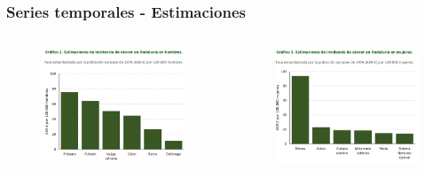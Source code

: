 \documentclass{beamer}
\begin{document}
\begin{frame}\frametitle{Series temporales - Estimaciones}

	\begin{columns}
		\begin{column}{0.5\textwidth}
			\begin{figure}
				\centering
				\includegraphics[width=\textwidth]{images/estimaciones_hombres.png}
			\end{figure}
		\end{column}
		\begin{column}{0.5\textwidth}
			\begin{figure}
				\centering
				\includegraphics[width=\textwidth]{images/estimaciones_mujeres.png}
			\end{figure}
		\end{column}
	\end{columns}

\end{frame}
\end{document}
